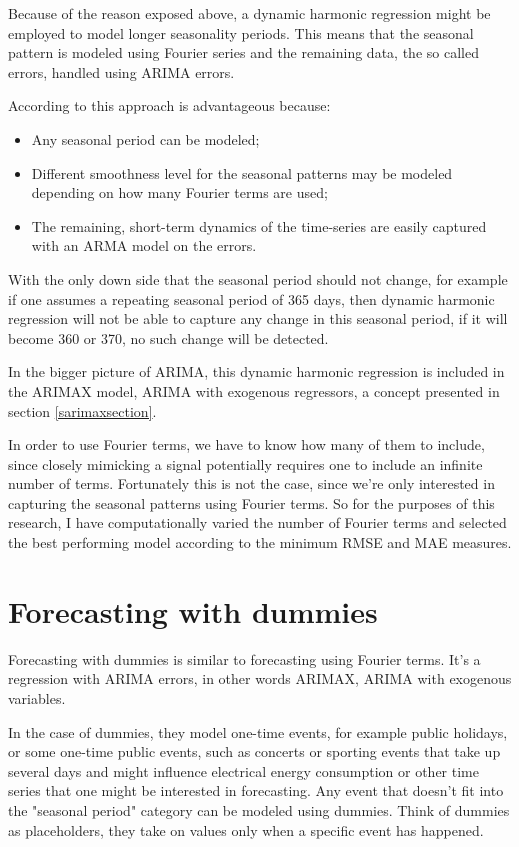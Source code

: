 \documentclass[12pt,a4paper,titlepage]{report}
\begin{document}
Because of the reason exposed above, a dynamic harmonic regression might be employed to model longer seasonality periods. This means that the seasonal pattern is modeled using Fourier series and the remaining data, the so called errors, handled using ARIMA errors.

According to \cite{fpp2dhr} this approach is advantageous because:
\begin{itemize}
    \item Any seasonal period can be modeled;
    \item Different smoothness level for the seasonal patterns may be modeled depending on how many Fourier terms are used;
    \item The remaining, short-term dynamics of the time-series are easily captured with an ARMA model on the errors.
\end{itemize}

With the only down side that the seasonal period should not change, for example if one assumes a repeating seasonal period of 365 days, then dynamic harmonic regression will not be able to capture any change in this seasonal period, if it will become 360 or 370, no such change will be detected.

In the bigger picture of ARIMA, this dynamic harmonic regression is included in the ARIMAX model, ARIMA with exogenous regressors, a concept presented in section \ref{sarimaxsection}.

In order to use Fourier terms, we have to know how many of them to include, since closely mimicking a signal potentially requires one to include an infinite number of terms. Fortunately this is not the case, since we're only interested in capturing the seasonal patterns using Fourier terms. So for the purposes of this research, I have computationally varied the number of Fourier terms and selected the best performing model according to the minimum RMSE and MAE measures.

\section{Forecasting with dummies} \label{dummiessection}

Forecasting with dummies is similar to forecasting using Fourier terms. It's a regression with ARIMA errors, in other words ARIMAX, ARIMA with exogenous variables.

In the case of dummies, they model one-time events, for example public holidays, or some one-time public events, such as concerts or sporting events that take up several days and might influence electrical energy consumption or other time series that one might be interested in forecasting. Any event that doesn't fit into the "seasonal period" category can be modeled using dummies. Think of dummies as placeholders, they take on values only when a specific event has happened.
\end{document}
